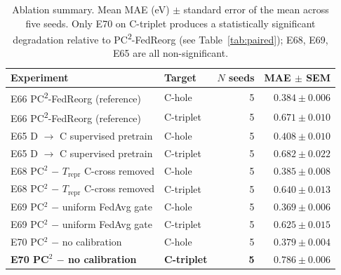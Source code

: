\documentclass[11pt,a4paper]{article}
\newcommand{\PC}{PC\textsuperscript{2}-FedReorg}
\begin{document}
\begin{table}[t]
\centering
\small
\caption{Ablation summary. Mean MAE (eV) $\pm$ standard error of the mean across five seeds. Only E70 on C-triplet produces a statistically significant degradation relative to \PC{} (see Table~\ref{tab:paired}); E68, E69, E65 are all non-significant.}\label{tab:ablation}
\begin{tabular}{@{}llrr@{}}
\toprule
Experiment & Target & $N$ seeds & MAE $\pm$ SEM \\
\midrule
E66 \PC{} (reference) & C-hole    & 5 & $0.384 \pm 0.006$ \\
E66 \PC{} (reference) & C-triplet & 5 & $0.671 \pm 0.010$ \\
\addlinespace
E65 D $\to$ C supervised pretrain          & C-hole    & 5 & $0.408 \pm 0.010$ \\
E65 D $\to$ C supervised pretrain          & C-triplet & 5 & $0.682 \pm 0.022$ \\
\addlinespace
E68 PC$^2$ $-$ $T_{\mathrm{repr}}$ C-cross removed   & C-hole    & 5 & $0.385 \pm 0.008$ \\
E68 PC$^2$ $-$ $T_{\mathrm{repr}}$ C-cross removed   & C-triplet & 5 & $0.640 \pm 0.013$ \\
\addlinespace
E69 PC$^2$ $-$ uniform FedAvg gate         & C-hole    & 5 & $0.369 \pm 0.006$ \\
E69 PC$^2$ $-$ uniform FedAvg gate         & C-triplet & 5 & $0.625 \pm 0.015$ \\
\addlinespace
E70 PC$^2$ $-$ no calibration              & C-hole    & 5 & $0.379 \pm 0.004$ \\
\textbf{E70 PC$^2$ $-$ no calibration}     & \textbf{C-triplet} & \textbf{5} & $\mathbf{0.786 \pm 0.006}$ \\
\bottomrule
\end{tabular}
\end{table}

\clearpage

\end{document}
